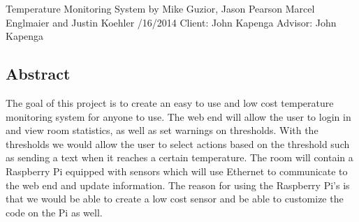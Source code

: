 \documentclass{report}
\begin{document}
\begin{titlepage}

\vspace*{\fill}
\begin{center}
Temperature Monitoring System \newline
by Mike Guzior, Jason Pearson \newline
Marcel Englmaier and Justin Koehler /16/2014 \newline
Client: John Kapenga \newline
Advisor: John Kapenga \newline
\end{center}
\vspace*{\fill}
\end{titlepage}
\newpage
\tableofcontents
\newpage

\subsection*{Abstract}
The goal of this project is to create an easy to use and low cost temperature monitoring system for anyone to use. 
The web end will allow the user to login in and view room statistics, as well as set warnings on thresholds. 
With the thresholds we would allow the user to select actions based on the threshold such as sending a text when it reaches a certain temperature. 
The room will contain a Raspberry Pi equipped with sensors which will use Ethernet to communicate to the web end and update information. 
The reason for using the Raspberry Pi’s is that we would be able to create a low cost sensor and be able to customize the code on the Pi as well. 
\newpage
\end{document}
